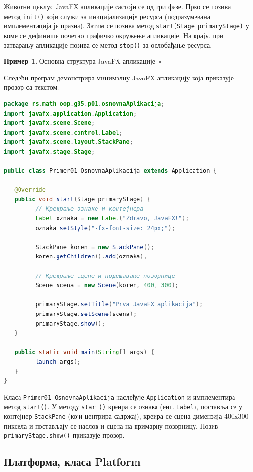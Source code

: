 Животни циклус JavaFX апликације састоји се од три фазе. Прво се позива метод \texttt{init()} који служи за иницијализацију ресурса (подразумевана имплементација је празна). Затим се позива метод \texttt{start(Stage primaryStage)} у коме се дефинише почетно графичко окружење апликације. На крају, при затварању апликације позива се метод \texttt{stop()} за ослобађање ресурса.


\bigskip

\noindent \textbf{Пример 1.} Основна структура JavaFX апликације. $\square$

\medskip

Следећи програм демонстрира минималну JavaFX апликацију која приказује прозор са текстом:


\begin{lstlisting}[language=Java]
package rs.math.oop.g05.p01.osnovnaAplikacija;
import javafx.application.Application;
import javafx.scene.Scene;
import javafx.scene.control.Label;
import javafx.scene.layout.StackPane;
import javafx.stage.Stage;
 
public class Primer01_OsnovnaAplikacija extends Application {
 
   @Override
   public void start(Stage primaryStage) {
         // Креирање ознаке и контејнера
         Label oznaka = new Label("Zdravo, JavaFX!");
         oznaka.setStyle("-fx-font-size: 24px;");
 
         StackPane koren = new StackPane();
         koren.getChildren().add(oznaka);
 
         // Креирање сцене и подешавање позорнице
         Scene scena = new Scene(koren, 400, 300);
 
         primaryStage.setTitle("Prva JavaFX aplikacija");
         primaryStage.setScene(scena);
         primaryStage.show();
   }
 
   public static void main(String[] args) {
         launch(args);
   }
}
\end{lstlisting}


Класа \texttt{Primer01\_OsnovnaAplikacija} наслеђује \texttt{Application} и имплементира метод \texttt{start()}. У методу \texttt{start()} креира се ознака (енг. \texttt{Label}), поставља се у контејнер \texttt{StackPane} (који центрира садржај), креира се сцена димензија 400x300 пиксела и постављају се наслов и сцена на примарну позорницу. Позив \texttt{primaryStage.show()} приказује прозор.


\subsection{Платформа, класа Platform}


